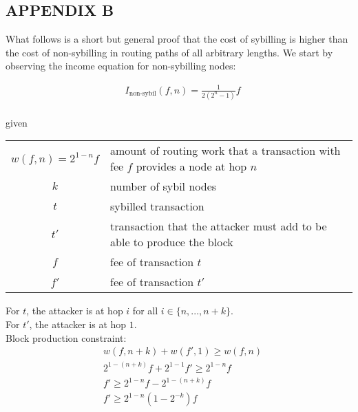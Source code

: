 \documentclass[oneside]{article}   	%
\begin{document}
\restoregeometry 

\pagebreak

\subsection*{APPENDIX B}

What follows is a short but general proof that the cost of sybilling is higher than the cost of non-sybilling in routing paths of all arbitrary lengths. We start by observing the income equation for non-sybilling nodes:

\begin{align*}
& I_{\text{non-sybil}}(f,n) = \frac{1}{2\left(2^{n}-1\right)} f \\
\end{align*}

given

\renewcommand{\arraystretch}{1.3}
\begin{tabular}{cp{}}

$w(f,n) = 2^{1-n}f$   & amount of routing work that a transaction with fee $f$ provides a node at hop $n$ \\
$k$               	& number of sybil nodes \\
$t$               	& sybilled transaction \\
$t'$              	& transaction that the attacker must add to be able to produce the block \\
$f$               	& fee of transaction $t$ \\
$f'$              	& fee of transaction $t'$ \\

\end{tabular}
\vspace{5mm}

For $t$, the attacker is at hop $i$ for all $i\in \{n,...,n+k\}$. \\
For $t'$, the attacker is at hop $1$. \\

Block production constraint:
\begin{align*}
& w(f,n+k) +w(f',1) \geqslant w(f,n) \\
& 2^{1-(n+k)}f + 2^{1-1}f' \geqslant 2^{1-n}f \\
& f' \geqslant 2^{1-n}f - 2^{1-(n+k)}f \\
& \boxed{f' \geqslant 2^{1-n}\left(1-2^{-k}\right) f} \\
\end{align*}
\end{document}
